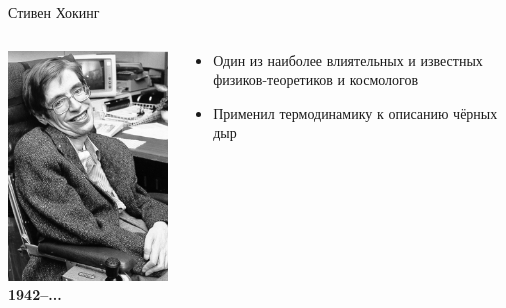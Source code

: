 \documentclass[usenames,dvipsnames,pdftex,unicode,hidelinks]{beamer}
\begin{document}
  \begin{frame}{Стивен Хокинг}
    \begin{columns}[t]
      \begin{column}{0.25\textwidth}
        \begin{center}
          \includegraphics[width=\textwidth]{hawking}\\
          \textbf{1942--...}
        \end{center}
      \end{column}
      \begin{column}{0.75\textwidth}
        \begin{itemize}
          \item<1-> Один из наиболее влиятельных и известных физиков-теоретиков и космологов
          \item<2-> Применил термодинамику к описанию чёрных дыр

\end{itemize}
\end{column}
\end{columns}
\end{frame}
\end{document}
